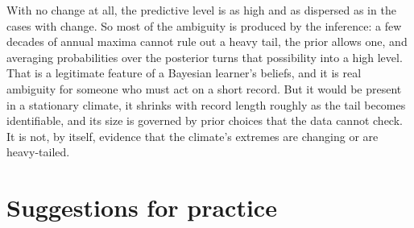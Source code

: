 \documentclass[11pt]{article}
\begin{document}
With no change at all, the predictive level is as high and as dispersed as in the cases with
change. So most of the ambiguity is produced by the inference: a few decades of annual maxima
cannot rule out a heavy tail, the prior allows one, and averaging probabilities over the posterior
turns that possibility into a high level. That is a legitimate feature of a Bayesian learner's
beliefs, and it is real ambiguity for someone who must act on a short record. But it would be
present in a stationary climate, it shrinks with record length roughly as the tail becomes
identifiable, and its size is governed by prior choices that the data cannot check. It is not, by
itself, evidence that the climate's extremes are changing or are heavy-tailed.

\section{Suggestions for practice}\label{sec:suggest}
\end{document}
